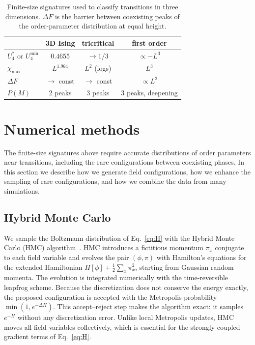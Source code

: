 \documentclass[aps,prd,twocolumn,superscriptaddress,nofootinbib,10pt]{revtex4-2}
\newcommand{\Ufour}{U_4}
\begin{document}
\begin{table}[t]
\caption{Finite-size signatures used to classify transitions in three
dimensions.  $\Delta F$ is the barrier between coexisting peaks of the
order-parameter distribution at equal height.}
\label{tab:fss}
\begin{ruledtabular}
\begin{tabular}{lccc}
 & 3D Ising & tricritical & first order\\
\hline
$\Ufour^{*}$ or $\Ufour^{\min}$ & $0.4655$ & $\to1/3$ & $\propto-L^3$\\
$\chi_{\max}$ & $L^{1.964}$ & $L^{2}$ (logs) & $L^3$\\
$\Delta F$ & $\to$ const & $\to$ const & $\propto L^2$\\
$P(M)$ & 2 peaks & 3 peaks & 3 peaks, deepening
\end{tabular}
\end{ruledtabular}
\end{table}

\section{Numerical methods}
\label{sec:methods}

The finite-size signatures above require accurate distributions of order
parameters near transitions, including the rare configurations between
coexisting phases.  In this section we describe how we generate field
configurations, how we enhance the sampling of rare configurations, and how
we combine the data from many simulations.

\subsection{Hybrid Monte Carlo}

We sample the Boltzmann distribution of Eq.~\eqref{eq:H} with the Hybrid
Monte Carlo (HMC) algorithm~\cite{Duane1987}.  HMC introduces a fictitious
momentum $\pi_x$ conjugate to each field variable and evolves the pair
$(\phi,\pi)$ with Hamilton's equations for the extended Hamiltonian
$H[\phi]+\frac12\sum_x\pi_x^2$, starting from Gaussian random momenta.  The
evolution is integrated numerically with the time-reversible leapfrog scheme.
Because the discretization does not conserve the energy exactly, the
proposed configuration is accepted with the Metropolis probability
$\min(1,e^{-\Delta H})$.  This accept--reject step makes the algorithm exact:
it samples $e^{-H}$ without any discretization error.  Unlike local Metropolis
updates, HMC moves all field variables collectively, which is essential for
the strongly coupled gradient terms of Eq.~\eqref{eq:H}.
\end{document}

